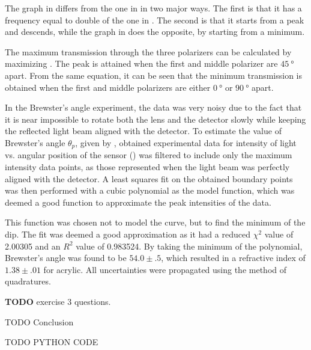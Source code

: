 \begin{paper}
	The graph in \figExerciseTwoFit differs from the one in \figExerciseOneFit in two major ways. The first is that it has a frequency equal to double of the one in \figExerciseOneFit. The second is that it starts from a peak and descends, while the graph in \figExerciseOneFit does the opposite, by starting from a minimum.
	
	The maximum transmission through the three polarizers can be calculated by maximizing \eqThreePolarizers. The peak is attained when the first and middle polarizer are $\SI{45}{\degree}$ apart. From the same equation, it can be seen that the minimum transmission is obtained when the first and middle polarizers are either $\SI{0}{\degree}$ or $\SI{90}{\degree}$ apart.
	
	In the Brewster's angle experiment, the data was very noisy due to the fact that it is near impossible to rotate both the lens and the detector slowly while keeping the reflected light beam aligned with the detector. To estimate the value of Brewster's angle \( \theta_p \), given by \eqPolarizingAngle, obtained experimental data for intensity of light vs. angular position of the sensor (\figExerciseThreeData) was filtered to include only the maximum intensity data points, as those represented when the light beam was perfectly aligned with the detector. A least squares fit on the obtained boundary points was then performed with a cubic polynomial as the model function, which was deemed a good function to approximate the peak intensities of the data.
	
	This function was chosen not to model the curve, but to find the minimum of the dip. The fit was deemed a good approximation as it had a reduced $\chi^2$ value of 2.00305 and an $R^2$ value of 0.983524. By taking the minimum of the polynomial, Brewster's angle was found to be $54.0\pm.5$, which resulted in a refractive index of $1.38\pm.01$ for acrylic. All uncertainties were propagated using the method of quadratures.
	
	
	\textbf{TODO} exercise 3 questions.
	

	TODO Conclusion
	


\end{paper}

TODO PYTHON CODE
